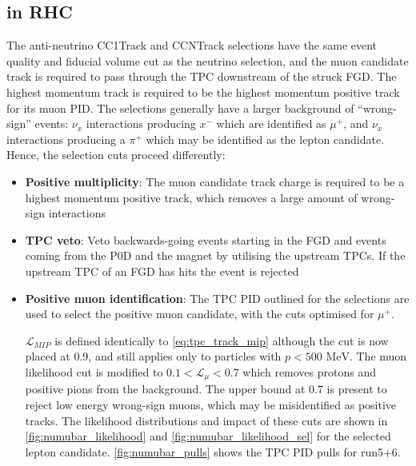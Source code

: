 \subsection{\numubar in RHC}
\label{sec:numubar_sel}
The anti-neutrino CC1Track and CCNTrack selections have the same event quality and fiducial volume cut as the neutrino selection, and the muon candidate track is required to pass through the TPC downstream of the struck FGD. The highest momentum track is required to be the highest momentum positive track for its muon PID. The selections generally have a larger background of ``wrong-sign'' events: $\nu_x$ interactions producing $x^-$ which are identified as $\mu^+$, and $\nu_x$ interactions producing a $\pi^+$ which may be identified as the lepton candidate. Hence, the selection cuts proceed differently:
\begin{itemize}
	\item \textbf{Positive multiplicity}: The muon candidate track charge is required to be a highest momentum positive track, which removes a large amount of wrong-sign interactions
	
	\item \textbf{TPC veto}: Veto backwards-going events starting in the FGD and events coming from the P0D and the magnet by utilising the upstream TPCs. If the upstream TPC of an FGD has hits the event is rejected
	
	\item \textbf{Positive muon identification}: The TPC PID outlined for the \numu selections are used to select the positive muon candidate, with the cuts optimised for $\mu^+$. 
	
	$\mathcal{L}_{MIP}$ is defined identically to \autoref{eq:tpc_track_mip} although the cut is now placed at 0.9, and still applies only to particles with $p < 500\text{ MeV}$. The muon likelihood cut is modified to $0.1 < \mathcal{L}_\mu < 0.7$ which removes protons and positive pions from the \numu background. The upper bound at 0.7 is present to reject low energy wrong-sign muons, which may be misidentified as positive tracks. The likelihood distributions and impact of these cuts are shown in \autoref{fig:numubar_likelihood} and \autoref{fig:numubar_likelihood_sel} for the selected lepton candidate. \autoref{fig:numubar_pulls} shows the TPC PID pulls for run5+6.
\end{itemize}

